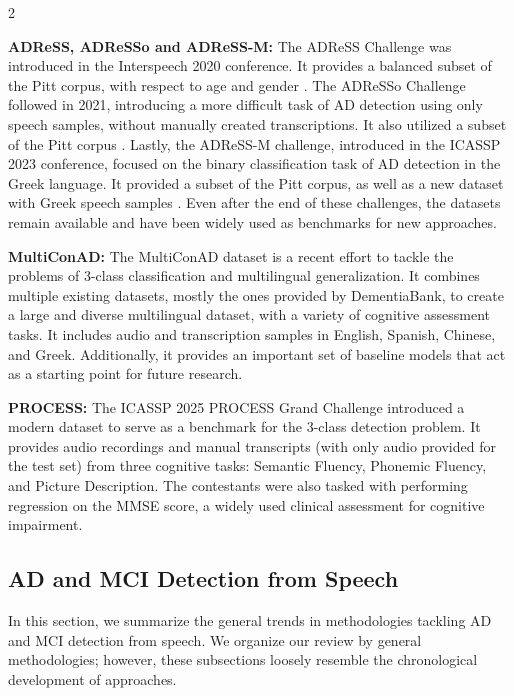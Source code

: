 \documentclass[10pt]{article}
\newcommand{\tpar}[1]{\par\textbf{#1: }}
\begin{document}
\begin{multicols}{2}
\tpar{ADReSS, ADReSSo and ADReSS-M} The ADReSS Challenge was introduced in the
Interspeech 2020 conference. It provides a balanced subset of the Pitt corpus,
with respect to age and gender \cite{luzAlzheimersDementiaRecognition2020}. The
ADReSSo Challenge followed in 2021, introducing a more difficult task of AD
detection using only speech samples, without manually created transcriptions.
It also utilized a subset of the Pitt corpus
\cite{luzDetectingCognitiveDecline}. Lastly, the ADReSS-M challenge, introduced
in the ICASSP 2023 conference, focused on the binary classification task of AD
detection in the Greek language. It provided a subset of the Pitt corpus, as
well as a new dataset with Greek speech samples
\cite{luzOverviewADReSSMSignal2024}. Even after the end of these challenges,
the datasets remain available and have been widely used as benchmarks for new
approaches. 

\tpar{MultiConAD} The MultiConAD dataset
\cite{shakeriMultiConADUnifiedMultilingual2025} is a recent effort to tackle
the problems of 3-class classification and multilingual generalization. It
combines multiple existing datasets, mostly the ones provided by DementiaBank,
to create a large and diverse multilingual dataset, with a variety of cognitive
assessment tasks. It includes audio and transcription samples in English,
Spanish, Chinese, and Greek. Additionally, it provides an important set of
baseline models that act as a starting point for future research. 

\tpar{PROCESS} The ICASSP 2025 PROCESS Grand Challenge
\cite{taoEarlyDementiaDetection2024} introduced a modern dataset to serve as a
benchmark for the 3-class detection problem. It provides audio recordings and
manual transcripts (with only audio provided for the test set) from three
cognitive tasks: Semantic Fluency, Phonemic Fluency, and Picture Description.
The contestants were also tasked with performing regression on the MMSE score,
a widely used clinical assessment for cognitive impairment.

\subsection{AD and MCI Detection from Speech} \par In this section, we
summarize the general trends in methodologies tackling AD and MCI detection
from speech. We organize our review by general methodologies; however, these
subsections loosely resemble the chronological development of approaches. 


\end{multicols}
\end{document}
